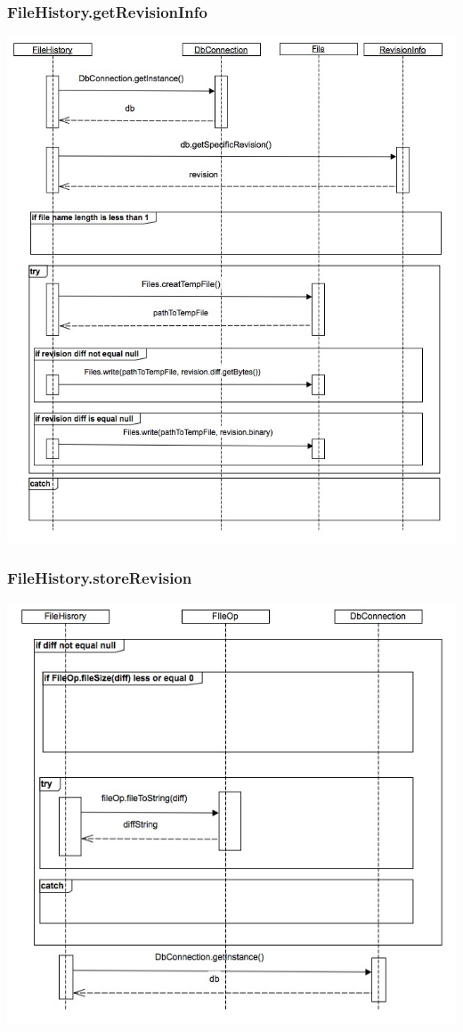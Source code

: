 \documentclass[12pt,a4paper]{article}
\begin{document}
\subsubsection{FileHistory.getRevisionInfo}
\includegraphics[width=\textwidth]{images/filehistory_getrivisioninfo-2.jpg}

\subsubsection{FileHistory.storeRevision}
\includegraphics[width=\textwidth]{images/filehistory_storerevision.jpg}
\end{document}
